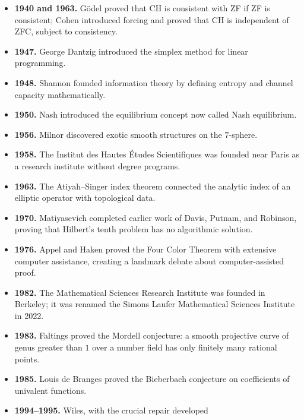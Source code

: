 \begin{itemize}
              machine and proved the undecidability of the halting problem.
              The first Fields Medals were awarded in Oslo.
        \item \textbf{1940 and 1963.} Gödel proved that CH is consistent with
              ZF if ZF is consistent; Cohen introduced forcing and proved that
              CH is independent of ZFC, subject to consistency.
        \item \textbf{1947.} George Dantzig introduced the simplex method for
              linear programming.
        \item \textbf{1948.} Shannon founded information theory by defining
              entropy and channel capacity mathematically.
        \item \textbf{1950.} Nash introduced the equilibrium concept now called
              Nash equilibrium.
        \item \textbf{1956.} Milnor discovered exotic smooth structures on the
              $7$-sphere.
        \item \textbf{1958.} The Institut des Hautes Études Scientifiques was
              founded near Paris as a research institute without degree
              programs.
        \item \textbf{1963.} The Atiyah--Singer index theorem connected the
              analytic index of an elliptic operator with topological data.
        \item \textbf{1970.} Matiyasevich completed earlier work of Davis,
              Putnam, and Robinson, proving that Hilbert's tenth problem has
              no algorithmic solution.
        \item \textbf{1976.} Appel and Haken proved the Four Color Theorem with
              extensive computer assistance, creating a landmark debate about
              computer-assisted proof.
        \item \textbf{1982.} The Mathematical Sciences Research Institute was
              founded in Berkeley; it was renamed the Simons Laufer
              Mathematical Sciences Institute in 2022.
        \item \textbf{1983.} Faltings proved the Mordell conjecture: a smooth
              projective curve of genus greater than $1$ over a number field
              has only finitely many rational points.
        \item \textbf{1985.} Louis de Branges proved the Bieberbach conjecture
              on coefficients of univalent functions.
        \item \textbf{1994--1995.} Wiles, with the crucial repair developed

\end{itemize}
